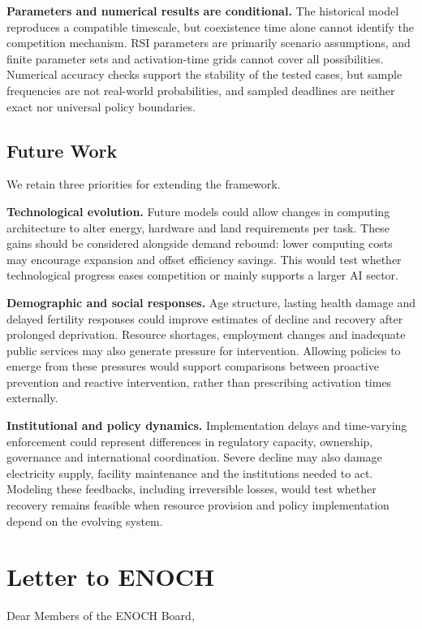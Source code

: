 \documentclass[12pt,a4paper]{article}
\theoremstyle{remark}
\begin{document}
\textbf{Parameters and numerical results are conditional.} The historical model reproduces a compatible timescale, but coexistence time alone cannot identify the competition mechanism. RSI parameters are primarily scenario assumptions, and finite parameter sets and activation-time grids cannot cover all possibilities. Numerical accuracy checks support the stability of the tested cases, but sample frequencies are not real-world probabilities, and sampled deadlines are neither exact nor universal policy boundaries.

\subsection{Future Work}

We retain three priorities for extending the framework.

\textbf{Technological evolution.} Future models could allow changes in computing architecture to alter energy, hardware and land requirements per task. These gains should be considered alongside demand rebound: lower computing costs may encourage expansion and offset efficiency savings. This would test whether technological progress eases competition or mainly supports a larger AI sector.

\textbf{Demographic and social responses.} Age structure, lasting health damage and delayed fertility responses could improve estimates of decline and recovery after prolonged deprivation. Resource shortages, employment changes and inadequate public services may also generate pressure for intervention. Allowing policies to emerge from these pressures would support comparisons between proactive prevention and reactive intervention, rather than prescribing activation times externally.

\textbf{Institutional and policy dynamics.} Implementation delays and time-varying enforcement could represent differences in regulatory capacity, ownership, governance and international coordination. Severe decline may also damage electricity supply, facility maintenance and the institutions needed to act. Modeling these feedbacks, including irreversible losses, would test whether recovery remains feasible when resource provision and policy implementation depend on the evolving system.

\FloatBarrier
\clearpage
\section*{Letter to ENOCH}
\noindent Dear Members of the ENOCH Board,
\end{document}
